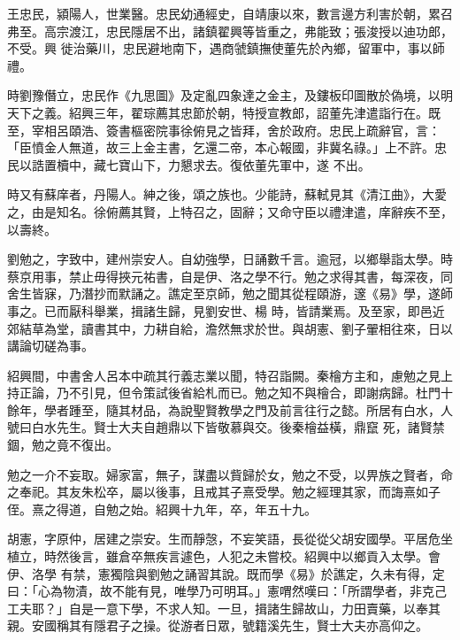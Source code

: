 \begin{pinyinscope}
 王忠民，潁陽人，世業醫。忠民幼通經史，自靖康以來，數言邊方利害於朝，累召弗至。高宗渡江，忠民隱居不出，諸鎮翟興等皆重之，弗能致；張浚授以迪功郎，不受。興
 徙治藥川，忠民避地南下，遇商虢鎮撫使董先於內鄉，留軍中，事以師禮。



 時劉豫僭立，忠民作《九思圖》及定亂四象達之金主，及鏤板印圖散於偽境，以明天下之義。紹興三年，翟琮薦其忠節於朝，特授宣教郎，詔董先津遣詣行在。既至，宰相呂頤浩、簽書樞密院事徐俯見之皆拜，舍於政府。忠民上疏辭官，言：「臣憤金人無道，故三上金主書，乞還二帝，本心報國，非冀名祿。」上不許。忠民以誥置櫝中，藏七寶山下，力懇求去。復依董先軍中，遂
 不出。



 時又有蘇庠者，丹陽人。紳之後，頌之族也。少能詩，蘇軾見其《清江曲》，大愛之，由是知名。徐俯薦其賢，上特召之，固辭；又命守臣以禮津遣，庠辭疾不至，以壽終。



 劉勉之，字致中，建州崇安人。自幼強學，日誦數千言。逾冠，以鄉舉詣太學。時蔡京用事，禁止毋得挾元祐書，自是伊、洛之學不行。勉之求得其書，每深夜，同舍生皆寐，乃潛抄而默誦之。譙定至京師，勉之聞其從程頤游，邃《易》學，遂師事之。已而厭科舉業，揖諸生歸，見劉安世、楊
 時，皆請業焉。及至家，即邑近郊結草為堂，讀書其中，力耕自給，澹然無求於世。與胡憲、劉子翬相往來，日以講論切磋為事。



 紹興間，中書舍人呂本中疏其行義志業以聞，特召詣闕。秦檜方主和，慮勉之見上持正論，乃不引見，但令策試後省給札而已。勉之知不與檜合，即謝病歸。杜門十餘年，學者踵至，隨其材品，為說聖賢教學之門及前言往行之懿。所居有白水，人號曰白水先生。賢士大夫自趙鼎以下皆敬慕與交。後秦檜益橫，鼎竄
 死，諸賢禁錮，勉之竟不復出。



 勉之一介不妄取。婦家富，無子，謀盡以貲歸於女，勉之不受，以畀族之賢者，命之奉祀。其友朱松卒，屬以後事，且戒其子熹受學。勉之經理其家，而誨熹如子侄。熹之得道，自勉之始。紹興十九年，卒，年五十九。



 胡憲，字原仲，居建之崇安。生而靜愨，不妄笑語，長從從父胡安國學。平居危坐植立，時然後言，雖倉卒無疾言遽色，人犯之未嘗校。紹興中以鄉貢入太學。會伊、洛學
 有禁，憲獨陰與劉勉之誦習其說。既而學《易》於譙定，久未有得，定曰：「心為物漬，故不能有見，唯學乃可明耳。」憲喟然嘆曰：「所謂學者，非克己工夫耶？」自是一意下學，不求人知。一旦，揖諸生歸故山，力田賣藥，以奉其親。安國稱其有隱君子之操。從游者日眾，號籍溪先生，賢士大夫亦高仰之。




\end{pinyinscope}
